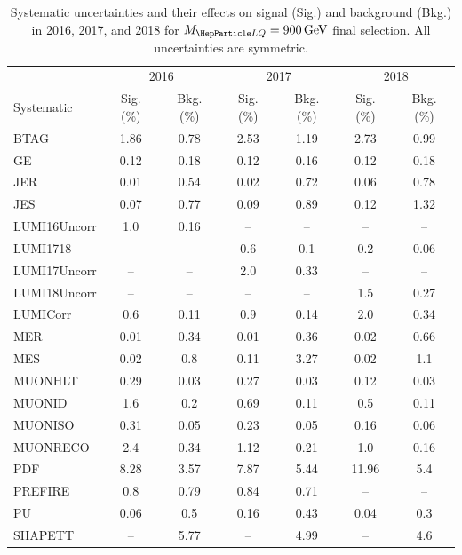 \begin{table}[H]
	\begin{center}
        \begin{footnotesize}
			\caption{Systematic uncertainties and their effects on signal (Sig.) and background (Bkg.) in 2016, 2017, and 2018 for $\MLQ = \SI{900}{GeV}$ final selection. All uncertainties are symmetric.}
			\begin{tabular}{lcccccc} \hline \hline
				& \multicolumn{2}{c}{2016} & \multicolumn{2}{c}{2017} & \multicolumn{2}{c}{2018} \\
				Systematic & Sig. (\%) & Bkg. (\%) & Sig. (\%) & Bkg. (\%) & Sig. (\%) & Bkg. (\%) \\ \hline
				BTAG &  1.86  &  0.78 &  2.53  &  1.19 &  2.73  &  0.99 \\
				GE &  0.12  &  0.18 &  0.12  &  0.16 &  0.12  &  0.18 \\
				JER &  0.01  &  0.54 &  0.02  &  0.72 &  0.06  &  0.78 \\
				JES &  0.07  &  0.77 &  0.09  &  0.89 &  0.12  &  1.32 \\
				LUMI16Uncorr &  1.0  &  0.16 & -- & -- & -- & -- \\
				LUMI1718 & -- & -- &  0.6  &  0.1 &  0.2  &  0.06 \\
				LUMI17Uncorr & -- & -- &  2.0  &  0.33 & -- & -- \\
				LUMI18Uncorr & -- & -- & -- & -- &  1.5  &  0.27 \\
				LUMICorr &  0.6  &  0.11 &  0.9  &  0.14 &  2.0  &  0.34 \\
				MER &  0.01  &  0.34 &  0.01  &  0.36 &  0.02  &  0.66 \\
				MES &  0.02  &  0.8 &  0.11  &  3.27 &  0.02  &  1.1 \\
				MUONHLT &  0.29  &  0.03 &  0.27  &  0.03 &  0.12  &  0.03 \\
				MUONID &  1.6  &  0.2 &  0.69  &  0.11 &  0.5  &  0.11 \\
				MUONISO &  0.31  &  0.05 &  0.23  &  0.05 &  0.16  &  0.06 \\
				MUONRECO &  2.4  &  0.34 &  1.12  &  0.21 &  1.0  &  0.16 \\
				PDF &  8.28  &  3.57 &  7.87  &  5.44 &  11.96  &  5.4 \\
				PREFIRE &  0.8  &  0.79 &  0.84  &  0.71 & -- & -- \\
				PU &  0.06  &  0.5 &  0.16  &  0.43 &  0.04  &  0.3 \\
				SHAPETT & -- &  5.77 & -- &  4.99 & -- &  4.6 \\

\end{tabular}
\end{footnotesize}
\end{center}
\end{table}

